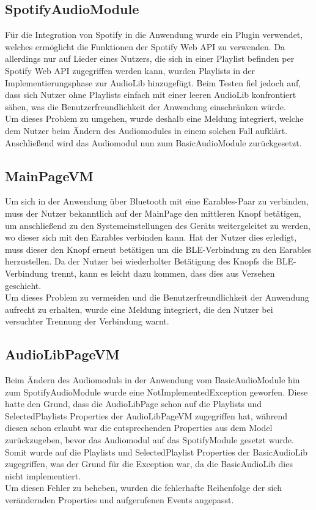 \documentclass[../validierung.tex]{subfiles}
\begin{document}
	\subsection{SpotifyAudioModule}
		Für die Integration von Spotify in die Anwendung wurde ein Plugin verwendet, welches ermöglicht die Funktionen der Spotify Web API zu verwenden.
		Da allerdings nur auf Lieder eines Nutzers, die sich in einer Playlist befinden per Spotify Web API zugegriffen werden kann, wurden Playlists in
		der Implementierungsphase zur AudioLib hinzugefügt. Beim Testen fiel jedoch auf, dass sich Nutzer ohne Playlists einfach mit einer leeren AudioLib
		konfrontiert sähen, was die Benutzerfreundlichkeit der Anwendung einschränken würde.\\ Um dieses Problem zu umgehen, wurde deshalb eine Meldung
		integriert, welche dem Nutzer beim Ändern des Audiomodules in einem solchen Fall aufklärt. Anschließend wird das Audiomodul nun zum
		BasicAudioModule zurückgesetzt.
	\subsection{MainPageVM}
		Um sich in der Anwendung über Bluetooth mit eine Earables-Paar zu verbinden, muss der Nutzer bekanntlich auf der MainPage den mittleren Knopf
		betätigen, um anschließend zu den Systemeinstellungen des Geräts weitergeleitet zu werden, wo dieser sich mit den Earables verbinden kann. Hat der
		Nutzer dies erledigt, muss dieser den Knopf erneut betätigen um die BLE-Verbindung zu den Earables herzustellen. Da der Nutzer bei wiederholter
		Betätigung des Knopfs die BLE-Verbindung trennt, kann es leicht dazu kommen, dass dies aus Versehen geschieht.\\ Um dieses Problem zu vermeiden
		und die Benutzerfreundlichkeit der Anwendung aufrecht zu erhalten, wurde eine Meldung integriert, die den Nutzer bei versuchter Trennung der
		Verbindung warnt.
	\subsection{AudioLibPageVM}
		Beim Ändern des Audiomoduls in der Anwendung vom BasicAudioModule hin zum SpotifyAudioModule wurde eine NotImplementedException geworfen. Diese
		hatte den Grund, dass die AudioLibPage schon auf die Playlists und SelectedPlaylists Properties der AudioLibPageVM zugegriffen hat, während diesen
		schon erlaubt war die entsprechenden Properties aus dem Model zurückzugeben, bevor das Audiomodul auf das SpotifyModule gesetzt wurde. Somit wurde
		auf die Playlists und SelectedPlaylist Properties der BasicAudioLib zugegriffen, was der Grund für die Exception war, da die BasicAudioLib dies
		nicht implementiert.\\ Um diesen Fehler zu beheben, wurden die fehlerhafte Reihenfolge der sich verändernden Properties und aufgerufenen Events angepasst.
\end{document}
